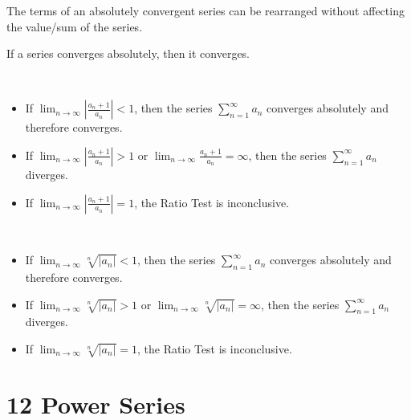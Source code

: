 \begin{theorem} The terms of an absolutely convergent series can be rearranged without affecting the value/sum of the series.
\end{theorem}

\begin{theorem} If a series converges absolutely, then it converges.
\end{theorem}

\begin{theorem} \ \\
  \begin{itemize}
    \item If ${\lim\limits}_{n \to \infty} \left|\frac{a_n + 1}{a_n}\right| < 1$, then the series ${\sum\limits}_{n=1}^\infty a_n$ converges absolutely and therefore converges.
    \item If ${\lim\limits}_{n \to \infty} \left|\frac{a_n + 1}{a_n}\right| > 1$ or ${\lim\limits}_{n \to \infty} \frac{a_n + 1}{a_n} = \infty$, then the series ${\sum\limits}_{n=1}^\infty a_n$ diverges.
    \item If ${\lim\limits}_{n \to \infty} \left|\frac{a_n + 1}{a_n}\right| = 1$, the Ratio Test is inconclusive.
  \end{itemize}
\end{theorem}

\begin{theorem} \ \\
  \begin{itemize}
    \item If ${\lim\limits}_{n \to \infty} \sqrt[n]{\left|a_n\right|} < 1$, then the series ${\sum\limits}_{n=1}^\infty a_n$ converges absolutely and therefore converges.
    \item If ${\lim\limits}_{n \to \infty} \sqrt[n]{\left|a_n\right|} > 1$ or ${\lim\limits}_{n \to \infty} \sqrt[n]{\left|a_n\right|} = \infty$, then the series ${\sum\limits}_{n=1}^\infty a_n$ diverges.
    \item If ${\lim\limits}_{n \to \infty} \sqrt[n]{\left|a_n\right|} = 1$, the Ratio Test is inconclusive.
  \end{itemize}
\end{theorem}

\section*{12 Power Series}

